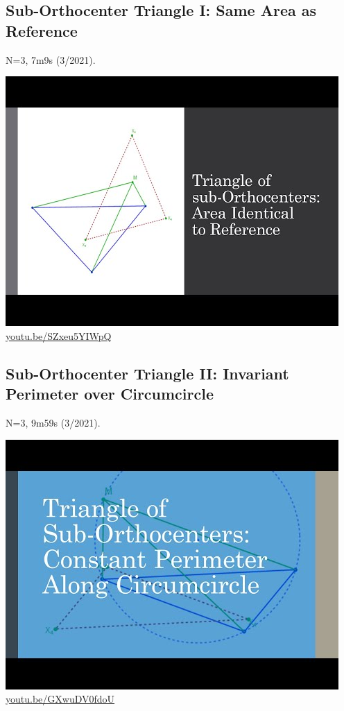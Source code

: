 \documentclass[12pt]{amsart}
\begin{document}
\subsection{Sub-Orthocenter Triangle I: Same Area as Reference}
\label{vid:SZxeu5YIWpQ}
\noindent N=3, 7m9s (3/2021). 
\begin{center}\includegraphics[width=.5\textwidth]{pics/SZxeu5YIWpQ.jpg} \\ 
\href{https://youtu.be/SZxeu5YIWpQ}{\url{youtu.be/SZxeu5YIWpQ}}\end{center}
% 

\subsection{Sub-Orthocenter Triangle II: Invariant Perimeter over Circumcircle}
\label{vid:GXwuDV0fdoU}
\noindent N=3, 9m59s (3/2021). 
\begin{center}\includegraphics[width=.5\textwidth]{pics/GXwuDV0fdoU.jpg} \\ 
\href{https://youtu.be/GXwuDV0fdoU}{\url{youtu.be/GXwuDV0fdoU}}\end{center}
% 
\end{document}
